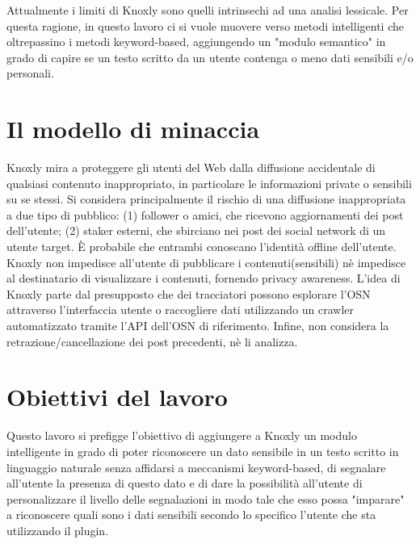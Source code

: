 Attualmente i limiti di Knoxly sono quelli intrinsechi ad una analisi lessicale. Per questa ragione, in questo lavoro ci si vuole muovere verso metodi intelligenti che oltrepassino i metodi keyword-based, aggiungendo un "modulo semantico" in grado di capire se un testo scritto da un utente contenga o meno dati sensibili e/o personali.

\section{Il modello di minaccia}
Knoxly mira a proteggere gli utenti del Web dalla diffusione accidentale di qualsiasi contenuto inappropriato, in particolare le informazioni private o sensibili su se stessi. Si considera principalmente il rischio di una diffusione inappropriata a due tipo di pubblico: (1) follower o amici, che ricevono aggiornamenti dei post dell'utente; (2) staker esterni, che sbirciano nei post dei social network di un utente target. È probabile che entrambi conoscano l'identità offline dell'utente. Knoxly non impedisce all'utente di pubblicare i contenuti(sensibili) nè impedisce al destinatario di visualizzare i contenuti, fornendo privacy awareness. L'idea di Knoxly parte dal presupposto che dei tracciatori possono esplorare l'OSN attraverso l'interfaccia utente o raccogliere dati utilizzando un crawler automatizzato tramite l'API dell'OSN di riferimento. Infine, non considera la retrazione/cancellazione dei post precedenti, nè li analizza.

\section{Obiettivi del lavoro}
Questo lavoro si prefigge l'obiettivo di aggiungere a Knoxly un modulo intelligente in grado di poter riconoscere un dato sensibile in un testo scritto in linguaggio naturale senza affidarsi a meccanismi keyword-based, di segnalare all'utente la presenza di questo dato e di dare la possibilità all'utente di personalizzare il livello delle segnalazioni in modo tale che esso possa "imparare" a riconoscere quali sono i dati sensibili secondo lo specifico l'utente che sta utilizzando il plugin.

